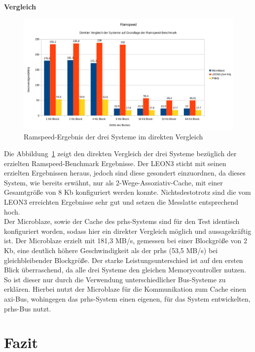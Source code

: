\newpage
\textbf{Vergleich}

\begin{figure}[H]
\centering
\includegraphics[width=1\textwidth]{Hauptteil/ramspeedresult.png}
\caption{Ramspeed-Ergebnis der drei Systeme im direkten Vergleich}
\label{fig:ramspeedresult}
\end{figure}

Die Abbildung~\ref{fig:ramspeedresult} zeigt den direkten Vergleich der drei Systeme bezüglich der erzielten Ramspeed-Benchmark Ergebnisse. Der LEON3 sticht mit seinen erzielten Ergebnissen
heraus, jedoch sind diese gesondert einzuordnen, da dieses System, wie bereits erwähnt, nur als 2-Wege-Assoziativ-Cache, mit einer Gesamtgröße von 8 Kb konfiguriert werden konnte. Nichtsdestotrotz
sind die vom LEON3 erreichten Ergebnisse sehr gut und setzen die Messlatte entsprechend hoch.\\
Der Microblaze, sowie der Cache des \ac{prhs}-Systems sind für den Test identisch konfiguriert worden, sodass hier ein direkter Vergleich möglich und aussagekräftig ist.
Der Microblaze erzielt mit 181,3 MB/s, gemessen bei einer Blockgröße von 2 Kb, eine deutlich höhere Geschwindigkeit als der \ac{prhs} (53,5 MB/s) bei gleichbleibender Blockgröße.
Der starke Leistungsunterschied ist auf den ersten Blick überraschend, da alle drei Systeme den gleichen Memorycontroller nutzen. So ist dieser nur durch die Verwendung unterschiedlicher
Bus-Systeme zu erklären. Hierbei nutzt der Microblaze für die Kommunikation zum Cache einen \ac{axi}-Bus, wohingegen das \ac{prhs}-System einen eigenen, für das System entwickelten,
\ac{prhs}-Bus nutzt.

\chapter{Fazit}\label{kap:fazit}

